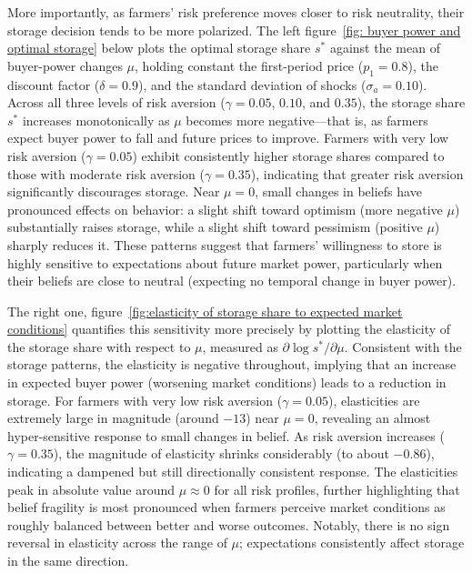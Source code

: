 More importantly, as farmers' risk preference moves closer to risk neutrality, their storage decision tends to be more polarized. The left figure~\ref{fig: buyer power and optimal storage} below plots the optimal storage share $s^*$ against the mean of buyer-power changes $\mu$, holding constant the first-period price ($p_1 = 0.8$), the discount factor ($\delta = 0.9$), and the standard deviation of shocks ($\sigma_a = 0.10$). Across all three levels of risk aversion ($\gamma = 0.05$, $0.10$, and $0.35$), the storage share $s^*$ increases monotonically as $\mu$ becomes more negative---that is, as farmers expect buyer power to fall and future prices to improve. Farmers with very low risk aversion ($\gamma = 0.05$) exhibit consistently higher storage shares compared to those with moderate risk aversion ($\gamma = 0.35$), indicating that greater risk aversion significantly discourages storage. Near $\mu = 0$, small changes in beliefs have pronounced effects on behavior: a slight shift toward optimism (more negative $\mu$) substantially raises storage, while a slight shift toward pessimism (positive $\mu$) sharply reduces it. These patterns suggest that farmers' willingness to store is highly sensitive to expectations about future market power, particularly when their beliefs are close to neutral (expecting no temporal change in buyer power).

The right one, figure~\ref{fig:elasticity of storage share to expected market conditions} quantifies this sensitivity more precisely by plotting the elasticity of the storage share with respect to $\mu$, measured as $\partial \log s^* / \partial \mu$. Consistent with the storage patterns, the elasticity is negative throughout, implying that an increase in expected buyer power (worsening market conditions) leads to a reduction in storage. For farmers with very low risk aversion ($\gamma = 0.05$), elasticities are extremely large in magnitude (around $-13$) near $\mu = 0$, revealing an almost hyper-sensitive response to small changes in belief. As risk aversion increases ($\gamma = 0.35$), the magnitude of elasticity shrinks considerably (to about $-0.86$), indicating a dampened but still directionally consistent response. The elasticities peak in absolute value around $\mu \approx 0$ for all risk profiles, further highlighting that belief fragility is most pronounced when farmers perceive market conditions as roughly balanced between better and worse outcomes. Notably, there is no sign reversal in elasticity across the range of $\mu$; expectations consistently affect storage in the same direction.

